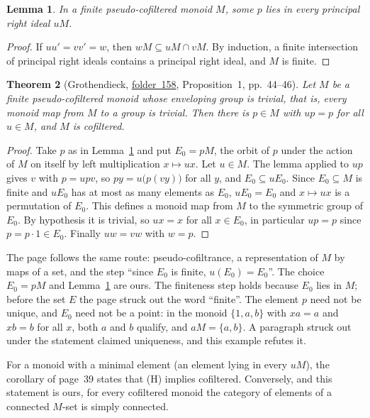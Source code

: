 \documentclass[11pt,a4paper]{amsart}
\newtheorem{theorem}{Theorem}[section]
\newtheorem{lemma}[theorem]{Lemma}
\theoremstyle{definition}
\theoremstyle{remark}
\newcommand{\fac}[1]{\href{https://grothendieck.umontpellier.fr/#1.pdf}{folder~#1}}
\begin{document}
\begin{lemma}\label{lem:p}
In a finite pseudo-cofiltered monoid $M$, some $p$ lies in every principal right ideal $uM$.
\end{lemma}

\begin{proof}
If $uu' = vv' = w$, then $wM \subseteq uM \cap vM$. By induction, a finite intersection of principal right ideals contains a principal right ideal, and $M$ is finite.
\end{proof}

\begin{theorem}[Grothendieck, \fac{158}, Proposition~1, pp.~44--46]\label{thm:monoid}
Let $M$ be a finite pseudo-cofiltered monoid whose enveloping group is trivial, that is, every monoid map from $M$ to a group is trivial. Then there is $p \in M$ with $up = p$ for all $u \in M$, and $M$ is cofiltered.
\end{theorem}

\begin{proof}
Take $p$ as in Lemma~\ref{lem:p} and put $E_0 = pM$, the orbit of $p$ under the action of $M$ on itself by left multiplication $x \mapsto ux$. Let $u \in M$. The lemma applied to $up$ gives $v$ with $p = upv$, so $py = u\bigl(p(vy)\bigr)$ for all $y$, and $E_0 \subseteq uE_0$. Since $E_0 \subseteq M$ is finite and $uE_0$ has at most as many elements as $E_0$, $uE_0 = E_0$ and $x \mapsto ux$ is a permutation of $E_0$. This defines a monoid map from $M$ to the symmetric group of $E_0$. By hypothesis it is trivial, so $ux = x$ for all $x \in E_0$, in particular $up = p$ since $p = p \cdot 1 \in E_0$. Finally $uw = vw$ with $w = p$.
\end{proof}

The page follows the same route: pseudo-cofiltrance, a representation of $M$ by maps of a set, and the step ``since $E_0$ is finite, $u(E_0) = E_0$''. The choice $E_0 = pM$ and Lemma~\ref{lem:p} are ours. The finiteness step holds because $E_0$ lies in $M$; before the set $E$ the page struck out the word ``finite''. The element $p$ need not be unique, and $E_0$ need not be a point: in the monoid $\{1, a, b\}$ with $xa = a$ and $xb = b$ for all $x$, both $a$ and $b$ qualify, and $aM = \{a, b\}$. A paragraph struck out under the statement claimed uniqueness, and this example refutes it.

For a monoid with a minimal element (an element lying in every $uM$), the corollary of page~39 states that (H) implies cofiltered. Conversely, and this statement is ours, for every cofiltered monoid the category of elements of a connected $M$-set is simply connected.
\end{document}
